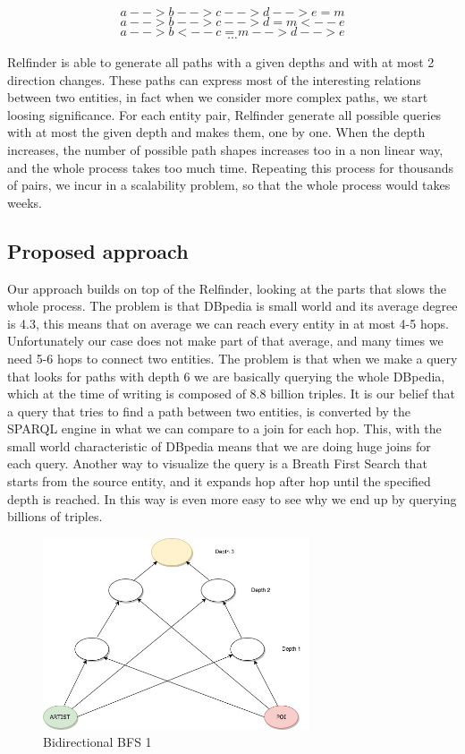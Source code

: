 \documentclass[paper=a4, fontsize=11pt]{scrartcl}
\begin{document}
$$a-->b-->c-->d-->e=m$$
$$a-->b-->c-->d=m<--e$$
$$a-->b<--c=m-->d-->e$$
$$\cdots$$

Relfinder is able to generate all paths with a given depths and with at most 2 direction changes.
These paths can express most of the interesting relations between two entities, in fact when we consider more complex paths, we start loosing significance.
For each entity pair, Relfinder generate all possible queries with at most the given depth and makes them, one by one.
When the depth increases, the number of possible path shapes increases too in a non linear way, and the whole process takes too much time. Repeating this process for thousands of pairs, we incur in a scalability problem, so that the whole process would takes weeks.

\subsection{Proposed approach}
Our approach builds on top of the Relfinder, looking at the parts that slows the whole process. 
The problem is that DBpedia is small world and its average degree is 4.3, this means that on average we can reach every entity in at most 4-5 hops. Unfortunately our case does not make part of that average, and many times we need 5-6 hops to connect two entities. The problem is that when we make a query that looks for paths with depth 6 we are basically querying the whole DBpedia, which at the time of writing is composed of 8.8 billion triples.
It is our belief that a query that tries to find a path between two entities, is converted by the SPARQL engine in what we can compare to a join for each hop. This, with the small world characteristic of DBpedia means that we are doing huge joins for each query.
Another way to visualize the query is a Breath First Search that starts from the source entity, and it expands hop after hop until the specified depth is reached. In this way is even more easy to see why we end up by querying billions of triples.

\begin{figure}[!htb]
  \centering 
    \includegraphics[width=0.7\textwidth]{images/Path_Discovering.jpg}
    \caption{Bidirectional BFS 1}
\end{figure}
\end{document}
